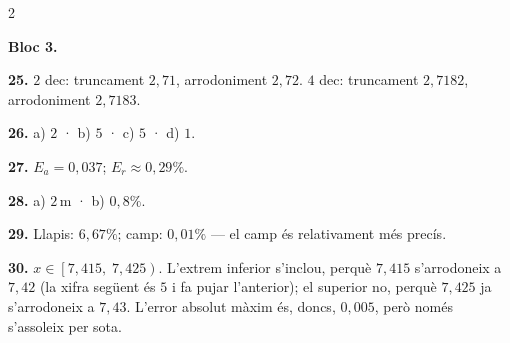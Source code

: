 \documentclass[13pt,a4paper]{extarticle}
\begin{document}
\begin{multicols}{2}
\begin{minipage}{\linewidth}
\textbf{Bloc 3.}\par
\end{minipage}\par\vspace{1.6mm}
\par\noindent\begin{minipage}{\linewidth}
\textbf{25.} $2$ dec: truncament $2{,}71$, arrodoniment $2{,}72$. $4$ dec: truncament $2{,}7182$, arrodoniment $2{,}7183$.\par
\end{minipage}\par\vspace{1.6mm}
\par\noindent\begin{minipage}{\linewidth}
\textbf{26.} a) $2$ · b) $5$ · c) $5$ · d) $1$.\par
\end{minipage}\par\vspace{1.6mm}
\par\noindent\begin{minipage}{\linewidth}
\textbf{27.} $E_a=0{,}037$; $E_r\approx0{,}29\%$.\par
\end{minipage}\par\vspace{1.6mm}
\par\noindent\begin{minipage}{\linewidth}
\textbf{28.} a) $2\,\text{m}$ · b) $0{,}8\%$.\par
\end{minipage}\par\vspace{1.6mm}
\par\noindent\begin{minipage}{\linewidth}
\textbf{29.} Llapis: $6{,}67\%$; camp: $0{,}01\%$ — el camp és relativament més precís.\par
\end{minipage}\par\vspace{1.6mm}
\par\noindent\begin{minipage}{\linewidth}
\textbf{30.} $x\in\left[7{,}415,\;7{,}425\right)$. L'extrem inferior s'inclou, perquè $7{,}415$ s'arrodoneix a $7{,}42$ (la xifra següent és $5$ i fa pujar l'anterior); el superior no, perquè $7{,}425$ ja s'arrodoneix a $7{,}43$. L'error absolut màxim és, doncs, $0{,}005$, però només s'assoleix per sota.\par

\end{minipage}
\end{multicols}
\end{document}

